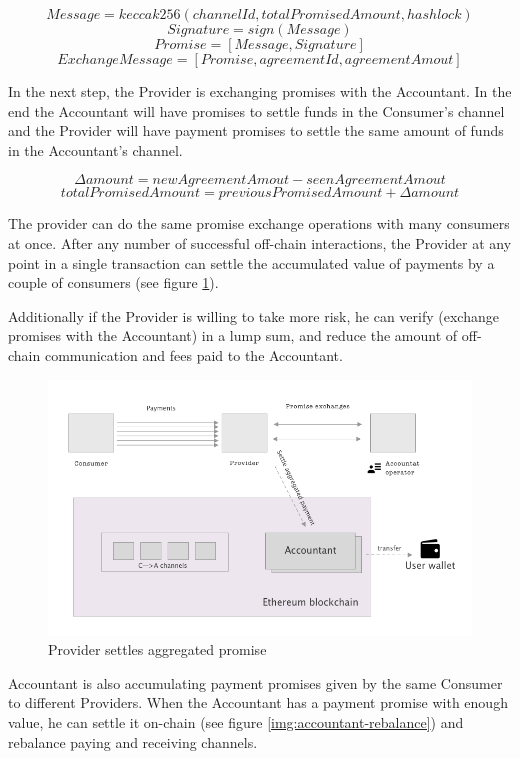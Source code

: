 \documentclass[a4paper,12pt]{article}
\begin{document}
\[ Message = keccak256(channelId, totalPromisedAmount, hashlock) \]
\[ Signature = sign(Message) \]
\[ Promise = [Message, Signature]\]
\[ ExchangeMessage = [Promise, agreementId, agreementAmout] \]

In the next step, the Provider is exchanging promises with the Accountant. In the 
end the Accountant will have promises to settle funds in the Consumer’s channel and 
the Provider will have payment promises to settle the same amount of funds in the 
Accountant’s channel. 

\[ \Delta amount = newAgreementAmout - seenAgreementAmout \]
\[ totalPromisedAmount = previousPromisedAmount + \Delta amount \]

The provider can do the same promise exchange operations with many consumers at 
once. After any number of successful off-chain interactions, the Provider at any 
point in a single transaction can settle the accumulated value of payments by a 
couple of consumers (see figure  \ref{img:payment}). 

Additionally if the Provider is willing to take more risk, he can verify (exchange 
promises with the Accountant) in a lump sum, and reduce the amount of off-chain 
communication and fees paid to the Accountant.

\begin{figure}[H]
    \centering
    \includegraphics[scale=0.4]{../img/payment}
    \caption{Provider settles aggregated promise}
    \label{img:payment}
\end{figure}

Accountant is also accumulating payment promises given by the same Consumer to 
different Providers. When the Accountant has a payment promise with enough value, 
he can settle it on-chain (see figure \ref{img:accountant-rebalance}) and rebalance
paying and receiving channels.
\end{document}
